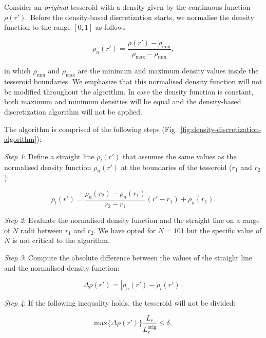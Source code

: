 \documentclass[extra, referee]{gji}
\begin{document}
Consider an \emph{original} tesseroid with a density given by the continuous function
$\rho(r')$.
Before the density-based discretization starts,
we normalise the density function to the range $[0, 1]$ as follows

\begin{equation}
    \rho_n(r') =
    \frac{\rho(r') - \rho_\text{min}}{\rho_\text{max} - \rho_\text{min}},
\end{equation}

\noindent in which $\rho_\text{min}$ and $\rho_\text{max}$ are the minimum and maximum
density values inside the tesseroid boundaries.
We emphasize that this normalised density function will not be modified throughout the
algorithm.
In case the density function is constant, both maximum and minimum densities will be
equal and the density-based discretization algorithm will not be applied.

The algorithm is comprised of the following steps
(Fig.~\ref{fig:density-discretization-algorithm}):

\textit{Step 1}:
Define a straight line $\rho_l(r')$ that assumes the same values as the normalised
density function $\rho_n(r')$ at the boundaries of the tesseroid ($r_1$ and $r_2$):

\begin{equation}
    \rho_l(r') =
    \frac{ \rho_n(r_2) - \rho_n(r_1) }{ r_2 - r_1 } (r' - r_1) + \rho_n(r_1).
    \label{eq:density-reference-line}
\end{equation}

\textit{Step 2}:
Evaluate the normalised density function and the straight line on a range of $N$ radii
between $r_1$ and $r_2$.
We have opted for $N = 101$ but the specific value of $N$ is not critical to the
algorithm.

\textit{Step 3}:
Compute the absolute difference between the values of the straight line and the
normalised density function:

\begin{equation}
    \Delta \rho (r') = | \rho_n(r') - \rho_l(r') |.
    \label{eq:density-abs-diff}
\end{equation}

\textit{Step 4}:
If the following inequality holds, the tesseroid will not be divided:

\begin{equation}
    \text{max}\{ \Delta \rho(r') \} \frac{L_r}{L_r^\text{orig}} \le \delta,
    \label{eq:delta-density}
\end{equation}
\end{document}
